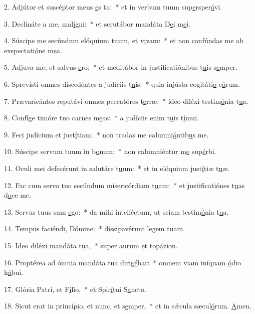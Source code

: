 2. Adjútor et suscéptor meus \uline{e}s tu:~* et in verbum tuum sup\uline{e}rsper\uline{á}vi.\par 
3. Declináte a me, mal\uline{í}gni:~* et scrutábor mandáta D\uline{e}i m\uline{e}i.\par 
4. Súscipe me secúndum elóquium tuum, et v\uline{i}vam:~* et non confúndas me ab exspectati\uline{ó}ne m\uline{e}a.\par 
5. Adjuva me, et salvus \uline{e}ro:~* et meditábor in justificatiónibus t\uline{u}is s\uline{e}mper.\par 
6. Sprevísti omnes discedéntes a judíciis t\uline{u}is:~* quia injústa cogitáti\uline{o} e\uline{ó}rum.\par 
7. Prævaricántes reputávi omnes peccatóres t\uline{e}rræ:~* ídeo diléxi testim\uline{ó}nia t\uline{u}a.\par 
8. Confíge timóre tuo carnes m\uline{e}as:~* a judíciis enim t\uline{u}is t\uline{í}mui.\par 
9. Feci judícium et just\uline{í}tiam:~* non tradas me calumni\uline{á}ntib\uline{u}s me.\par 
10. Súscipe servum tuum in b\uline{o}num:~* non calumniéntur m\uline{e} sup\uline{é}rbi.\par 
11. Oculi mei defecérunt in salutáre t\uline{u}um:~* et in elóquium just\uline{í}tiæ t\uline{u}æ.\par 
12. Fac cum servo tuo secúndum misericórdiam t\uline{u}am:~* et justificatiónes t\uline{u}as d\uline{o}ce me.\par 
13. Servus tuus sum \uline{e}go:~* da mihi intelléctum, ut sciam testim\uline{ó}nia t\uline{u}a.\par 
14. Tempus faciéndi, D\uline{ó}mine:~* díssipavérunt l\uline{e}gem t\uline{u}am.\par 
15. Ideo diléxi mandáta t\uline{u}a,~* super aurum \uline{e}t top\uline{á}zion.\par 
16. Proptérea ad ómnia mandáta tua dirig\uline{é}bar:~* omnem viam iníquam \uline{ó}dio h\uline{á}bui.\par 
17. Glória Patri, et F\uline{í}lio,~* et Spir\uline{í}tui S\uline{a}ncto.\par 
18. Sicut erat in princípio, et nunc, et s\uline{e}mper,~* et in sǽcula sæcul\uline{ó}rum. \uline{A}men.\par 
